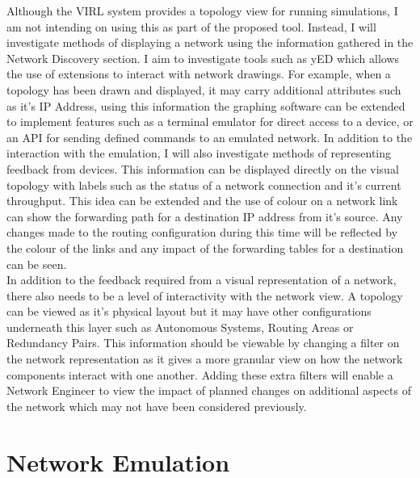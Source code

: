 \documentclass[11pt]{report}
\begin{document}
Although the VIRL system provides a topology view for running simulations, I am not intending on using this as part of the proposed tool. Instead, I will investigate methods of displaying a network using the information gathered in the Network Discovery section. I aim to investigate tools such as yED which allows the use of extensions to interact with network drawings. For example, when a topology has been drawn and displayed, it may carry additional attributes such as it's IP Address, using this information the graphing software can be extended to implement features such as a terminal emulator for direct access to a device, or an API for sending defined commands to an emulated network. In addition to the interaction with the emulation, I will also investigate methods of representing feedback from devices. This information can be displayed directly on the visual topology with labels such as the status of a network connection and it's current throughput. This idea can be extended and the use of colour on a network link can show the forwarding path for a destination IP address from it's source. Any changes made to the routing configuration during this time will be reflected by the colour of the links and any impact of the forwarding tables for a destination can be seen.
\\
In addition to the feedback required from a visual representation of a network, there also needs to be a level of interactivity with the network view. A topology can be viewed as it's physical layout but it may have other configurations underneath this layer such as Autonomous Systems, Routing Areas or Redundancy Pairs. This information should be viewable by changing a filter on the network representation as it gives a more granular view on how the network components interact with one another. Adding these extra filters will enable a Network Engineer to view the impact of planned changes on additional aspects of the network which may not have been considered previously.

\section{Network Emulation}
\end{document}
